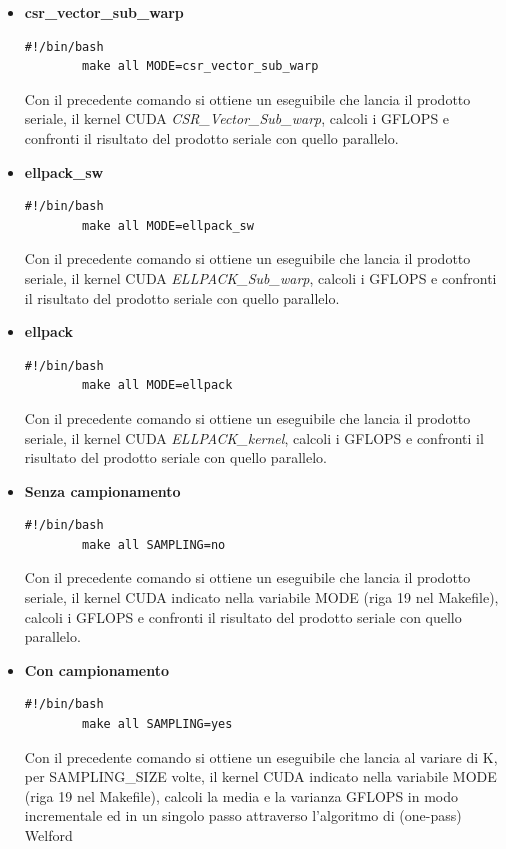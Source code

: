 \documentclass{article}
\begin{document}
\begin{itemize}
\begin{itemize}
        \item \textbf{csr\_vector\_sub\_warp}
        \begin{lstlisting}[style=bashstyle]
        #!/bin/bash
        make all MODE=csr_vector_sub_warp
        \end{lstlisting} Con il precedente comando si ottiene un eseguibile che lancia il prodotto seriale, il kernel CUDA \textit{CSR\_Vector\_Sub\_warp}, calcoli i GFLOPS e confronti il risultato del prodotto seriale con quello parallelo. 
        \item \textbf{ellpack\_sw}
        \begin{lstlisting}[style=bashstyle]
        #!/bin/bash
        make all MODE=ellpack_sw
        \end{lstlisting} Con il precedente comando si ottiene un eseguibile che lancia il prodotto seriale, il kernel CUDA \textit{ELLPACK\_Sub\_warp}, calcoli i GFLOPS e confronti il risultato del prodotto seriale con quello parallelo. 
        \item \textbf{ellpack}
        \begin{lstlisting}[style=bashstyle]
        #!/bin/bash
        make all MODE=ellpack
        \end{lstlisting} Con il precedente comando si ottiene un eseguibile che lancia il prodotto seriale, il kernel CUDA \textit{ELLPACK\_kernel}, calcoli i GFLOPS e confronti il risultato del prodotto seriale con quello parallelo. 
    \end{itemize}

    \begin{itemize}
            \item[\Checkmark] \textbf{Senza campionamento}
         \begin{lstlisting}[style=bashstyle]
        #!/bin/bash
        make all SAMPLING=no
        \end{lstlisting} Con il precedente comando si ottiene un eseguibile che lancia il prodotto seriale, il kernel CUDA indicato nella variabile MODE (riga 19 nel Makefile), calcoli i GFLOPS e confronti il risultato del prodotto seriale con quello parallelo. 
        \item[\Checkmark] \textbf{Con campionamento}
        \begin{lstlisting}[style=bashstyle]
        #!/bin/bash
        make all SAMPLING=yes
        \end{lstlisting} Con il precedente comando si ottiene un eseguibile che lancia al variare di K, per SAMPLING\_SIZE volte, il kernel CUDA indicato nella variabile MODE (riga 19 nel Makefile), calcoli la media e la varianza GFLOPS in modo incrementale ed in un singolo passo attraverso l'algoritmo di (one-pass) Welford
    \end{itemize}
\end{itemize}
\end{document}

